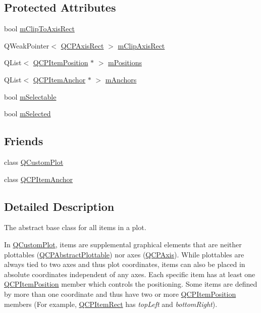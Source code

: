 \subsection*{Protected Attributes}
\begin{DoxyCompactItemize}
\item 
bool \hyperlink{class_q_c_p_abstract_item_ad2a70ff6b658fcb84a9427f69d3f587d}{m\-Clip\-To\-Axis\-Rect}
\item 
Q\-Weak\-Pointer$<$ \hyperlink{class_q_c_p_axis_rect}{Q\-C\-P\-Axis\-Rect} $>$ \hyperlink{class_q_c_p_abstract_item_a1af22df15e38a7fa22c0e15a674999f9}{m\-Clip\-Axis\-Rect}
\item 
Q\-List$<$ \hyperlink{class_q_c_p_item_position}{Q\-C\-P\-Item\-Position} $\ast$ $>$ \hyperlink{class_q_c_p_abstract_item_af94ff71b6a15ea6d028ab8bd8eccd012}{m\-Positions}
\item 
Q\-List$<$ \hyperlink{class_q_c_p_item_anchor}{Q\-C\-P\-Item\-Anchor} $\ast$ $>$ \hyperlink{class_q_c_p_abstract_item_a909a3abab783de302ebf0a0e6f2bbc15}{m\-Anchors}
\item 
bool \hyperlink{class_q_c_p_abstract_item_ad81eb35c8726a0f458db9df9732e0e41}{m\-Selectable}
\item 
bool \hyperlink{class_q_c_p_abstract_item_a4bdb3457dad1d268c0f78a44152b9645}{m\-Selected}
\end{DoxyCompactItemize}
\subsection*{Friends}
\begin{DoxyCompactItemize}
\item 
class \hyperlink{class_q_c_p_abstract_item_a1cdf9df76adcfae45261690aa0ca2198}{Q\-Custom\-Plot}
\item 
class \hyperlink{class_q_c_p_abstract_item_a61767d414fd57af9eb1741b34268c7fc}{Q\-C\-P\-Item\-Anchor}
\end{DoxyCompactItemize}


\subsection{Detailed Description}
The abstract base class for all items in a plot. 

In \hyperlink{class_q_custom_plot}{Q\-Custom\-Plot}, items are supplemental graphical elements that are neither plottables (\hyperlink{class_q_c_p_abstract_plottable}{Q\-C\-P\-Abstract\-Plottable}) nor axes (\hyperlink{class_q_c_p_axis}{Q\-C\-P\-Axis}). While plottables are always tied to two axes and thus plot coordinates, items can also be placed in absolute coordinates independent of any axes. Each specific item has at least one \hyperlink{class_q_c_p_item_position}{Q\-C\-P\-Item\-Position} member which controls the positioning. Some items are defined by more than one coordinate and thus have two or more \hyperlink{class_q_c_p_item_position}{Q\-C\-P\-Item\-Position} members (For example, \hyperlink{class_q_c_p_item_rect}{Q\-C\-P\-Item\-Rect} has {\itshape top\-Left} and {\itshape bottom\-Right}).

